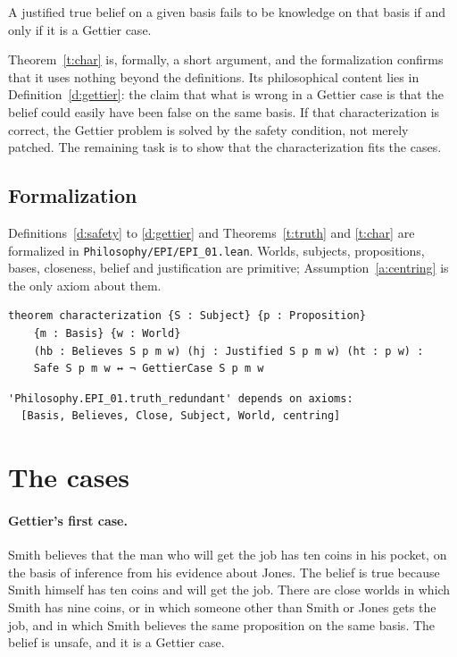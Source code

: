 \documentclass{situationist-preprint}
\begin{document}
\begin{corollary}\label{c:gettier}
A justified true belief on a given basis fails to be knowledge on that basis if and only if it is a Gettier case.
\end{corollary}

Theorem~\ref{t:char} is, formally, a short argument, and the formalization confirms that it uses nothing beyond the definitions. Its philosophical content lies in Definition~\ref{d:gettier}: the claim that what is wrong in a Gettier case is that the belief could easily have been false on the same basis. If that characterization is correct, the Gettier problem is solved by the safety condition, not merely patched. The remaining task is to show that the characterization fits the cases.

\subsection{Formalization}

Definitions~\ref{d:safety} to \ref{d:gettier} and Theorems~\ref{t:truth} and \ref{t:char} are formalized in \nolinkurl{Philosophy/EPI/EPI_01.lean}. Worlds, subjects, propositions, bases, closeness, belief and justification are primitive; Assumption~\ref{a:centring} is the only axiom about them.

\begin{lstlisting}
theorem characterization {S : Subject} {p : Proposition}
    {m : Basis} {w : World}
    (hb : Believes S p m w) (hj : Justified S p m w) (ht : p w) :
    Safe S p m w ↔ ¬ GettierCase S p m w
\end{lstlisting}

\begin{lstlisting}
'Philosophy.EPI_01.truth_redundant' depends on axioms:
  [Basis, Believes, Close, Subject, World, centring]
\end{lstlisting}

\section{The cases}

\paragraph{Gettier's first case.} Smith believes that the man who will get the job has ten coins in his pocket, on the basis of inference from his evidence about Jones. The belief is true because Smith himself has ten coins and will get the job. There are close worlds in which Smith has nine coins, or in which someone other than Smith or Jones gets the job, and in which Smith believes the same proposition on the same basis. The belief is unsafe, and it is a Gettier case.
\end{document}
